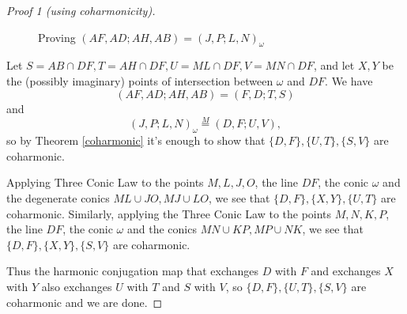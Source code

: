\documentclass[letterpaper,11pt]{article}
\theoremstyle{definition}
\theoremstyle{remark}
\begin{document}
\begin{proof}[Proof 1 (using coharmonicity)]
\begin{figure}[!htb]
\caption{Proving $(AF,AD;AH,AB) = (J,P;L,N)_\omega$}\label{octa1}
\end{figure}
Let $S = AB \cap DF, T = AH \cap DF, U = ML \cap DF, V = MN \cap DF$, and let $X,Y$ be the (possibly imaginary) points of intersection between $\omega$ and $DF$. We have
\[
(AF,AD;AH,AB) = (F,D;T,S)
\]
and
\[
(J,P;L,N)_\omega \stackrel{M}{=} (D,F;U,V),
\]
so by Theorem \ref{coharmonic} it's enough to show that $\{D,F\},\{U,T\},\{S,V\}$ are coharmonic.

Applying Three Conic Law to the points $M,L,J,O$, the line $DF$, the conic $\omega$ and the degenerate conics $ML\cup JO, MJ\cup LO$, we see that $\{D,F\}, \{X,Y\}, \{U,T\}$ are coharmonic. Similarly, applying the Three Conic Law to the points $M,N,K,P$, the line $DF$, the conic $\omega$ and the conics $MN\cup KP, MP\cup NK$, we see that $\{D,F\}, \{X,Y\}, \{S,V\}$ are coharmonic.

Thus the harmonic conjugation map that exchanges $D$ with $F$ and exchanges $X$ with $Y$ also exchanges $U$ with $T$ and $S$ with $V$, so $\{D,F\},\{U,T\},\{S,V\}$ are coharmonic and we are done.
\end{proof}
\end{document}
